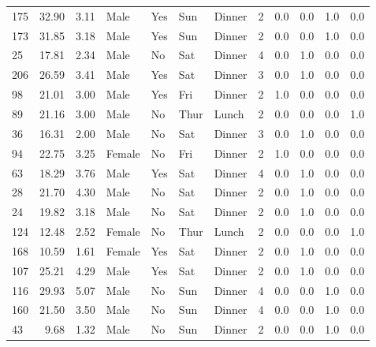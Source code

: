 \documentclass[
  letterpaper,
  DIV=11,
  numbers=noendperiod]{scrreprt}
\begin{document}
\begin{tabular}{lrrllllrrrrr}
175 &       32.90 &  3.11 &    Male &    Yes &   Sun &  Dinner &     2 &     0.0 &     0.0 &     1.0 &      0.0 \\
173 &       31.85 &  3.18 &    Male &    Yes &   Sun &  Dinner &     2 &     0.0 &     0.0 &     1.0 &      0.0 \\
25  &       17.81 &  2.34 &    Male &     No &   Sat &  Dinner &     4 &     0.0 &     1.0 &     0.0 &      0.0 \\
206 &       26.59 &  3.41 &    Male &    Yes &   Sat &  Dinner &     3 &     0.0 &     1.0 &     0.0 &      0.0 \\
98  &       21.01 &  3.00 &    Male &    Yes &   Fri &  Dinner &     2 &     1.0 &     0.0 &     0.0 &      0.0 \\
89  &       21.16 &  3.00 &    Male &     No &  Thur &   Lunch &     2 &     0.0 &     0.0 &     0.0 &      1.0 \\
36  &       16.31 &  2.00 &    Male &     No &   Sat &  Dinner &     3 &     0.0 &     1.0 &     0.0 &      0.0 \\
94  &       22.75 &  3.25 &  Female &     No &   Fri &  Dinner &     2 &     1.0 &     0.0 &     0.0 &      0.0 \\
63  &       18.29 &  3.76 &    Male &    Yes &   Sat &  Dinner &     4 &     0.0 &     1.0 &     0.0 &      0.0 \\
28  &       21.70 &  4.30 &    Male &     No &   Sat &  Dinner &     2 &     0.0 &     1.0 &     0.0 &      0.0 \\
24  &       19.82 &  3.18 &    Male &     No &   Sat &  Dinner &     2 &     0.0 &     1.0 &     0.0 &      0.0 \\
124 &       12.48 &  2.52 &  Female &     No &  Thur &   Lunch &     2 &     0.0 &     0.0 &     0.0 &      1.0 \\
168 &       10.59 &  1.61 &  Female &    Yes &   Sat &  Dinner &     2 &     0.0 &     1.0 &     0.0 &      0.0 \\
107 &       25.21 &  4.29 &    Male &    Yes &   Sat &  Dinner &     2 &     0.0 &     1.0 &     0.0 &      0.0 \\
116 &       29.93 &  5.07 &    Male &     No &   Sun &  Dinner &     4 &     0.0 &     0.0 &     1.0 &      0.0 \\
160 &       21.50 &  3.50 &    Male &     No &   Sun &  Dinner &     4 &     0.0 &     0.0 &     1.0 &      0.0 \\
43  &        9.68 &  1.32 &    Male &     No &   Sun &  Dinner &     2 &     0.0 &     0.0 &     1.0 &      0.0 \\

\end{tabular}
\end{document}
